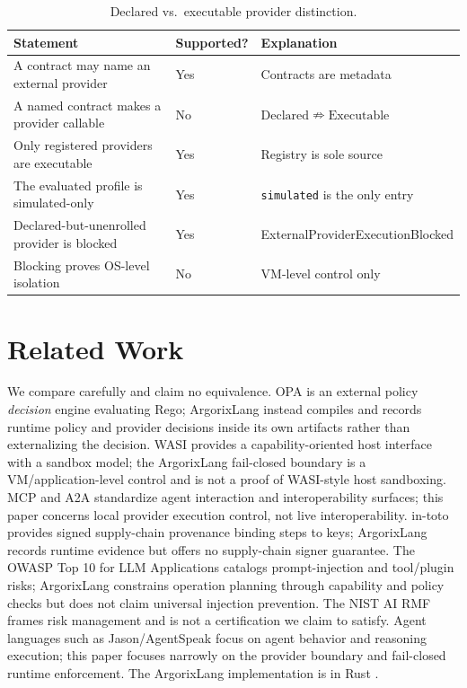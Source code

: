 \documentclass[conference]{IEEEtran}
\newcommand{\code}[1]{\texttt{\small #1}}
\newcommand{\Argorix}{%
\textcolor{argViolet}{A}\textcolor{argViolet}{r}\textcolor{argIndigo}{g}\textcolor{argIndigo}{o}\textcolor{argElectric}{r}\textcolor{argElectric}{i}\textcolor{argElectric}{x}\textcolor{argCyan}{L}\textcolor{argCyan}{a}\textcolor{argCyanBright}{n}\textcolor{argCyanBright}{g}\xspace}
\begin{document}
\begin{table}[t]
\centering
\caption{Declared vs.\ executable provider distinction.}
\label{tab:declexec}
\renewcommand{\arraystretch}{1.25}
\scriptsize
\setlength{\tabcolsep}{3pt}
\begin{tabular}{@{}L{0.44\columnwidth}L{0.14\columnwidth}L{0.28\columnwidth}@{}}
\toprule
\textbf{Statement} & \textbf{Supported?} & \textbf{Explanation} \\
\midrule
A contract may name an external provider & Yes & Contracts are metadata \\
A named contract makes a provider callable & No & $\mathrm{Declared}\nRightarrow\mathrm{Executable}$ \\
Only registered providers are executable & Yes & Registry is sole source \\
The evaluated profile is simulated-only & Yes & \code{simulated} is the only entry \\
Declared-but-unenrolled provider is blocked & Yes & \textsf{External\-Provider\-Execution\-Blocked} \\
Blocking proves OS-level isolation & No & VM-level control only \\
\bottomrule
\end{tabular}
\end{table}

\section{Related Work}\label{sec:related}
We compare carefully and claim no equivalence. OPA \cite{opa_docs} is an external policy
\emph{decision} engine evaluating Rego; \Argorix instead compiles and records runtime
policy and provider decisions inside its own artifacts rather than externalizing the
decision. WASI \cite{wasi_intro} provides a capability-oriented host interface with a
sandbox model; the \Argorix fail-closed boundary is a VM/application-level control and is
not a proof of WASI-style host sandboxing. MCP and A2A \cite{mcp_spec_2025,a2a_spec}
standardize agent interaction and interoperability surfaces; this paper concerns local
provider execution control, not live interoperability. in-toto
\cite{torresarias2019intoto} provides signed supply-chain provenance binding steps to
keys; \Argorix records runtime evidence but offers no supply-chain signer guarantee. The
OWASP Top 10 for LLM Applications \cite{owasp_llm_top10} catalogs prompt-injection and
tool/plugin risks; \Argorix constrains operation planning through capability and policy
checks but does not claim universal injection prevention. The NIST AI RMF
\cite{tabassi2023airmf} frames risk management and is not a certification we claim to
satisfy. Agent languages such as Jason/AgentSpeak \cite{bordini2007jason} focus on agent
behavior and reasoning execution; this paper focuses narrowly on the provider boundary and
fail-closed runtime enforcement. The \Argorix implementation is in Rust
\cite{rust_project}.
\end{document}
